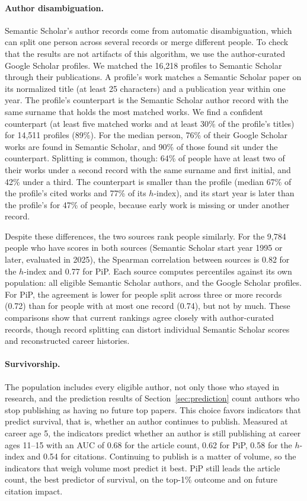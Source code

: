 \documentclass[11pt]{article}
\begin{document}
\paragraph{Author disambiguation.} Semantic Scholar's author records come from automatic disambiguation, which can split
one person across several records or merge different people. To check that the results are not artifacts of this
algorithm, we use the author-curated Google Scholar profiles. We matched the 16,218 profiles to Semantic Scholar through
their publications. A profile's work matches a Semantic Scholar paper on its normalized title (at least 25 characters)
and a publication year within one year. The profile's counterpart is the Semantic Scholar author record with the same
surname that holds the most matched works. We find a confident counterpart (at least five matched works and at least
30\% of the profile's titles) for 14,511 profiles (89\%). For the median person, 76\% of their Google Scholar works are
found in Semantic Scholar, and 90\% of those found sit under the counterpart. Splitting is common, though: 64\% of
people have at least two of their works under a second record with the same surname and first initial, and 42\% under a
third. The counterpart is smaller than the profile (median 67\% of the profile's cited works and 77\% of its
$h$-index), and its start year is later than the profile's for 47\% of people, because early work is missing or under
another record.

Despite these differences, the two sources rank people similarly. For the 9,784 people who have scores in both sources
(Semantic Scholar start year 1995 or later, evaluated in 2025), the Spearman correlation between sources is 0.82 for the
$h$-index and 0.77 for PiP. Each source computes percentiles against its own population: all eligible Semantic Scholar
authors, and the Google Scholar profiles. For PiP, the agreement is lower for people split across three or more records
(0.72) than for people with at most one record (0.74), but not by much. These comparisons show that current rankings
agree closely with author-curated records, though record splitting can distort individual Semantic Scholar scores and
reconstructed career histories.

\paragraph{Survivorship.} The population includes every eligible author, not only those who stayed in research, and
the prediction results of Section~\ref{sec:prediction} count authors who stop publishing as having no future top
papers. This choice favors indicators that predict survival, that is, whether an author continues to publish. Measured
at career age 5, the indicators predict whether an author is still publishing at career ages 11--15 with an AUC of
0.68 for the article count, 0.62 for PiP, 0.58 for the $h$-index and 0.54 for citations. Continuing to publish is a
matter of volume, so the indicators that weigh volume most predict it best. PiP still leads the article count, the
best predictor of survival, on the top-1\% outcome and on future citation impact.
\end{document}
